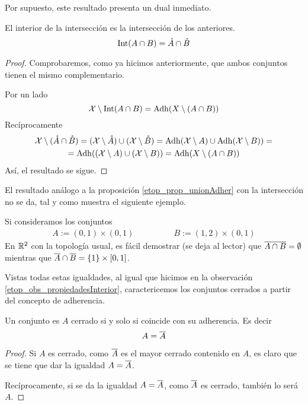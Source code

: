 Por supuesto, este resultado presenta un dual inmediato.
\begin{cor}
	El interior de la intersección es la intersección de los anteriores.
	\begin{equation*}
		\operatorname{\mathrm{Int}}(A\cap B)=\mathring{A}\cap\mathring{B}
	\end{equation*}
\end{cor}
\begin{proof}
	Comprobaremos, como ya hicimos anteriormente, que ambos conjuntos tienen el mismo complementario.
	
	Por un lado
	\begin{equation*}
		\mathcal{X} \setminus \operatorname{\mathrm{Int}}(A\cap B)=\operatorname{\mathrm{Adh}}(X\setminus (A\cap B))
	\end{equation*}
	Recíprocamente
	\begin{multline*}
		\mathcal{X} \setminus (\mathring{A}\cap \mathring{B})=(\mathcal{X} \setminus \mathring{A})\cup(\mathcal{X} \setminus \mathring{B})=\operatorname{\mathrm{Adh}}(\mathcal{X} \setminus A)\cup \operatorname{\mathrm{Adh}}(\mathcal{X} \setminus B))=\\=\operatorname{\mathrm{Adh}}((\mathcal{X} \setminus A) \cup (\mathcal{X} \setminus B))=\operatorname{\mathrm{Adh}}(X\setminus (A\cap B))
	\end{multline*}
	Así, el resultado se sigue.
\end{proof}
El resultado análogo a la proposición \ref{etop_prop_unionAdher} con la intersección no se da, tal y como muestra el siguiente ejemplo.
\begin{exa}
	\label{etop_ejem_cuadradosAbiertos}
	Si consideramos los conjuntos
	\begin{equation*}
		\begin{array}{cc}
		A:=(0,1)\times(0,1)\qquad&\qquad B:=(1,2)\times(0,1)
		\end{array}
	\end{equation*}
	En $\mathbb{R}^2$ con la topología usual, es fácil demostrar (se deja al lector) que $\overline{A\cap B}=\emptyset$ mientras que $\overline{A}\cap\overline{B}=\{1\}\times[0,1]$.
\end{exa}
Vistas todas estas igualdades, al igual que hicimos en la observación \ref{etop_obs_propiedadesInterior}, caractericemos los conjuntos cerrados a partir del concepto de adherencia.
\begin{prop}
	\label{etop_prop_cerradosAdher}
	Un conjunto es $A$ cerrado si y solo si coincide con su adherencia. Es decir
	\begin{equation*}
		A=\overline{A}
	\end{equation*}
\end{prop}
\begin{proof}
	Si $A$ es cerrado, como $\overline{A}$ es el mayor cerrado contenido en $A$, es claro que se tiene que dar la igualdad $A=\overline{A}$.
	
	Recíprocamente, si se da la igualdad $A=\overline{A}$, como $\overline{A}$ es cerrado, también lo será $A$.
\end{proof}
